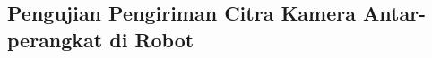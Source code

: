 \subsection{Pengujian Pengiriman Citra Kamera Antar-perangkat di Robot}
\label{subsec:citraantarperangkatrobot}

\textcolor{red}{\lipsum[1-2]}
